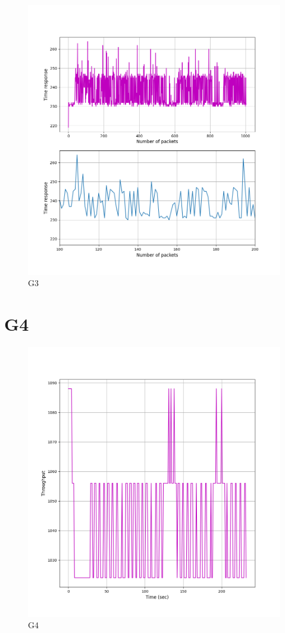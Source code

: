 \documentclass[hidelinks, 12pt, a4paper]{article}
\begin{document}
\begin{figure}[h!]
\centering
	\includegraphics[height=.4\textheight, width=\textwidth]{assets/session1/g3.png}
	\caption{G3} 
\end{figure}

\section{G4}

\begin{figure}[h!]
\centering
	\includegraphics[height=.4\textheight, width=\textwidth]{assets/session1/g4.png}
	\caption{G4} 
\end{figure}
\end{document}
